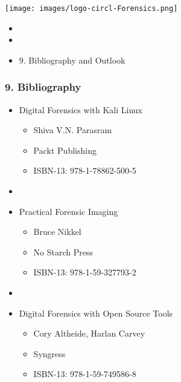 %
%



\begin{frame}
    \texttt{[image: images/logo-circl-Forensics.png]}
    \begin{itemize}
        \item[]
        \item[]
        \item[] 9. Bibliography and Outlook
    \end{itemize}
\end{frame}


\begin{frame}[fragile]
  \frametitle{9. Bibliography}
  \begin{itemize}
      \item Digital Forensics with Kali Linux
        \begin{itemize}
            \item[] Shiva V.N. Parasram
            \item[] Packt Publishing
            \item[] ISBN-13: 978-1-78862-500-5
        \end{itemize}
      \item[]
      \item Practical Forensic Imaging
        \begin{itemize}
            \item[] Bruce Nikkel
            \item[] No Starch Press
            \item[] ISBN-13: 978-1-59-327793-2
        \end{itemize}
      \item[]
      \item Digital Forensics with Open Source Tools
        \begin{itemize}
            \item[] Cory Altheide, Harlan Carvey
            \item[] Syngress
            \item[] ISBN-13: 978-1-59-749586-8
        \end{itemize}
  \end{itemize}
\end{frame}


